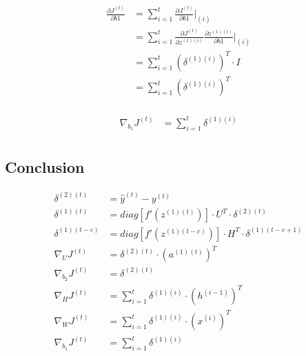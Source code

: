 \documentclass{article}
\begin{document}
	\begin{equation}
	\begin{aligned}
		\frac{\partial J^{(t)}}{\partial b1} &= \sum_{i=1}^{t} \frac{\partial J^{(t)}}{\partial b1}\bigg|_{(i)}  \\
		&= \sum_{i=1}^{t}
		\frac{\partial J^{(t)}}{\partial z^{(1)(i)}} 
		\frac{\partial z^{(1)(i)}}{\partial b1}\bigg|_{(i)} \\
		&= \sum_{i=1}^{t}
		(\delta^{(1)(i)})^T \cdot I \\
		&= \sum_{i=1}^{t} (\delta^{(1)(i)})^T\\
	\end{aligned}
	\end{equation}
	
	\begin{equation}
	\begin{aligned}
		\nabla_{b_1} J^{(t)} &= \sum_{i=1}^{t} \delta^{(1)(i)} \\
	\end{aligned}
	\end{equation}	
	
	\subsection{Conclusion}
	\begin{align}
		\delta^{(2)(t)} &= \hat{y}^{(t)} - y^{(t)} \\
		\delta^{(1)(t)} &= diag[f'(z^{(1)(t)})] \cdot U^T \cdot \delta^{(2)(t)}\\
		\delta^{(1)(t-c)} &= diag[f'(z^{(1)(t-c)})] \cdot H^T \cdot \delta^{(1)(t-c+1)}\\
		\nabla_U J^{(t)} &= \delta^{(2)(t)} \cdot (a^{(1)(t)})^T\\
		\nabla_{b_2} J^{(t)} &= \delta^{(2)(t)} \\
		\nabla_H J^{(t)} &= \sum_{i=1}^{t} \delta^{(1)(i)} \cdot  (h^{(i-1)})^T\\
		\nabla_W J^{(t)} &= \sum_{i=1}^{t} \delta^{(1)(i)} \cdot  (x^{(i)})^T\\
		\nabla_{b_1} J^{(t)} &= \sum_{i=1}^{t} \delta^{(1)(i)} \\
	\end{align}
	
	\newpage
\end{document}
